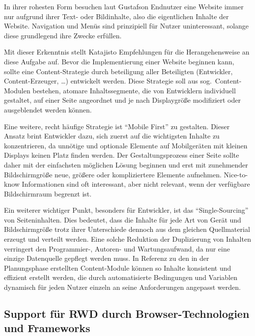In ihrer rohesten Form besuchen laut Gustafson \autocite[Kap. 1]{Gustafson.AdaptiveWebDesign.2011} Endnutzer eine Website immer nur aufgrund ihrer Text- oder Bildinhalte, also die eigentlichen Inhalte der Website.
Navigation und Menüs sind prinzipiell für Nutzer uninteressant, solange diese grundlegend ihre Zwecke erfüllen.

Mit dieser Erkenntnis stellt Katajisto \autocite[S. 4]{Katajisto.CreatingSupportContent.2015} Empfehlungen für die Herangehensweise an diese Aufgabe auf.
Bevor die Implementierung einer Website beginnen kann, sollte eine Content-Strategie durch beteiligung aller Beteiligten (Entwickler, Content-Erzeuger, \ldots) entwickelt werden.
Diese Strategie soll aus sog.\ Content-Modulen bestehen, atomare Inhaltssegmente, die von Entwicklern individuell gestaltet, auf einer Seite angeordnet und je nach Displaygröße modifiziert oder ausgeblendet werden können.

Eine weitere, recht häufige Strategie ist "`Mobile First"' \autocite{Wroblewski.MobileFirst.2009} zu gestalten.
Dieser Ansatz brint Entwickler dazu, sich zuerst auf die wichtigsten Inhalte zu konzentrieren, da unnötige und optionale Elemente auf Mobilgeräten mit kleinen Displays keinen Platz finden werden.
Der Gestaltungsprozess einer Seite sollte daher mit der einfachsten möglichen Lösung beginnen und erst mit zunehmender Bildschirmgröße neue, größere oder kompliziertere Elemente aufnehmen.
Nice-to-know Informationen sind oft interessant, aber nicht relevant, wenn der verfügbare Bildschirmraum begrenzt ist.

Ein weiterer wichtiger Punkt, besonders für Entwickler, ist das "`Single-Sourcing"' \autocite[S. 3--4]{Katajisto.CreatingSupportContent.2015} von Seiteninhalten.
Dies bedeutet, dass die Inhalte für jede Art von Gerät und Bildschirmgröße trotz ihrer Unterschiede dennoch aus dem gleichen Quellmaterial erzeugt und verteilt werden.
Eine solche Reduktion der Duplizierung von Inhalten verringert den Programmier-, Autoren- und Wartungsaufwand, da nur eine einzige Datenquelle gepflegt werden muss.
In Referenz zu den in der Planungsphase erstellten Content-Module können so Inhalte konsistent und effizient erstellt werden, die durch automatisierte Bedingungen und Variablen dynamisch für jeden Nutzer einzeln an seine Anforderungen angepasst werden.


\subsection{Support für RWD durch Browser-Technologien und Frameworks}

